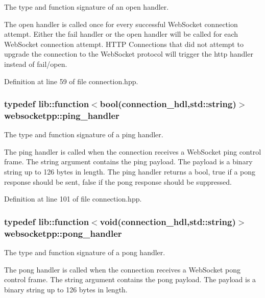 The type and function signature of an open handler. 

The open handler is called once for every successful Web\+Socket connection attempt. Either the fail handler or the open handler will be called for each Web\+Socket connection attempt. H\+T\+TP Connections that did not attempt to upgrade the connection to the Web\+Socket protocol will trigger the http handler instead of fail/open. 

Definition at line 59 of file connection.\+hpp.

\subsubsection[{\texorpdfstring{ping\+\_\+handler}{ping\_handler}}]{\setlength{\rightskip}{0pt plus 5cm}typedef lib\+::function$<$bool({\bf connection\+\_\+hdl},std\+::string)$>$ {\bf websocketpp\+::ping\+\_\+handler}}\hypertarget{namespacewebsocketpp_a9dcaaa7370865f1bcacb55ae715793ef}{}\label{namespacewebsocketpp_a9dcaaa7370865f1bcacb55ae715793ef}


The type and function signature of a ping handler. 

The ping handler is called when the connection receives a Web\+Socket ping control frame. The string argument contains the ping payload. The payload is a binary string up to 126 bytes in length. The ping handler returns a bool, true if a pong response should be sent, false if the pong response should be suppressed. 

Definition at line 101 of file connection.\+hpp.

\subsubsection[{\texorpdfstring{pong\+\_\+handler}{pong\_handler}}]{\setlength{\rightskip}{0pt plus 5cm}typedef lib\+::function$<$void({\bf connection\+\_\+hdl},std\+::string)$>$ {\bf websocketpp\+::pong\+\_\+handler}}\hypertarget{namespacewebsocketpp_a1798d54e6d98a481cf870091af84bc1f}{}\label{namespacewebsocketpp_a1798d54e6d98a481cf870091af84bc1f}


The type and function signature of a pong handler. 

The pong handler is called when the connection receives a Web\+Socket pong control frame. The string argument contains the pong payload. The payload is a binary string up to 126 bytes in length. 

